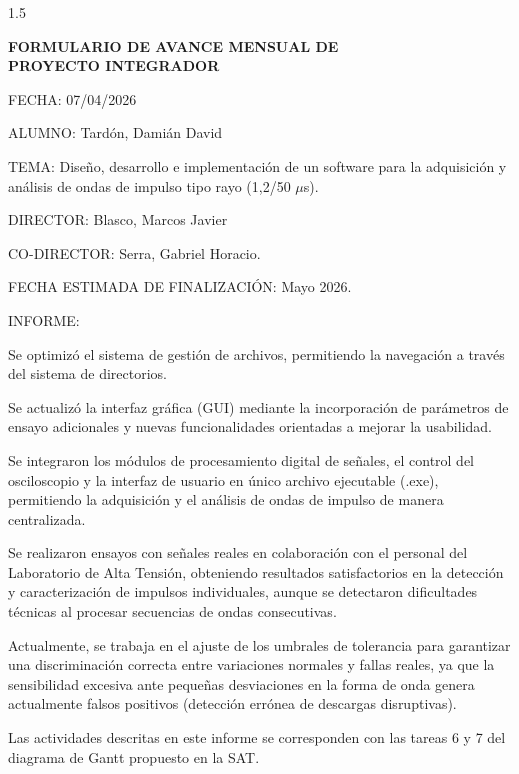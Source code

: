 \documentclass[11pt]{report} %
\begin{document}
    \begin{spacing}{1.5}
        \begin{flushleft}

                \begin{center}
                    \Large
                    \textbf{FORMULARIO DE AVANCE MENSUAL DE\\
                    PROYECTO INTEGRADOR}
                \end{center}
                \vspace{2em}

                FECHA: 07/04/2026

                ALUMNO: Tardón, Damián David

                TEMA: Diseño, desarrollo e implementación de un software para la adquisición y análisis de ondas de impulso tipo rayo (1,2/50 \(\mu\)s).

                DIRECTOR: Blasco, Marcos Javier

                CO-DIRECTOR: Serra, Gabriel Horacio.

                FECHA ESTIMADA DE FINALIZACIÓN: Mayo 2026.

                \hrulefill

                INFORME:

        \end{flushleft}
    \end{spacing}

    Se optimizó el sistema de gestión de archivos, permitiendo la navegación a través del sistema de directorios.\par
    Se actualizó la interfaz gráfica (GUI) mediante la incorporación de parámetros de ensayo adicionales y nuevas funcionalidades orientadas a mejorar la usabilidad.\par
    Se integraron los módulos de procesamiento digital de señales, el control del osciloscopio y la interfaz de usuario en único archivo ejecutable (.exe), permitiendo la adquisición y el análisis de ondas de impulso de manera centralizada.\par
    Se realizaron ensayos con señales reales en colaboración con el personal del Laboratorio de Alta Tensión, obteniendo resultados satisfactorios en la detección y caracterización de impulsos individuales, aunque se detectaron dificultades técnicas al procesar secuencias de ondas consecutivas.\par
    Actualmente, se trabaja en el ajuste de los umbrales de tolerancia para garantizar una discriminación correcta entre variaciones normales y fallas reales, ya que la sensibilidad excesiva ante pequeñas desviaciones en la forma de onda genera actualmente falsos positivos (detección errónea de descargas disruptivas).\par
    Las actividades descritas en este informe se corresponden con las tareas 6 y 7 del diagrama de Gantt propuesto en la SAT.\par
\end{document}
